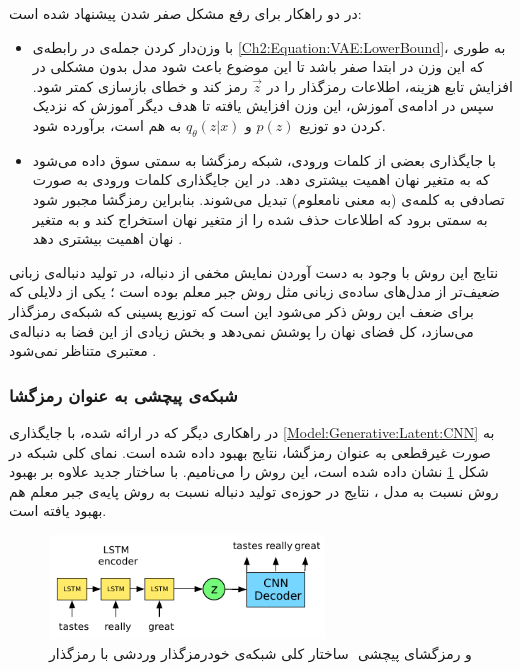  در
 دو راهکار برای رفع مشکل صفر شدن
  پیشنهاد شده است:
  \begin{itemize}
  	\item 
با وزن‌دار کردن جمله‌ی 
  	در رابطه‌ی
  	\ref{Ch2:Equation:VAE:LowerBound}، 
  به طوری که این وزن در ابتدا صفر باشد تا این موضوع باعث شود مدل بدون مشکلی در افزایش تابع هزینه، اطلاعات رمزگذار را در
  	$\vec{z}$
  	رمز کند و خطای بازسازی کمتر شود. سپس در ادامه‌ی آموزش، این وزن افزایش یافته تا هدف دیگر آموزش که نزدیک کردن دو توزیع 
  	$p(z)$
  	و
  	$q_{\theta}(z|x)$
  	به هم است، برآورده شود. 
  	\item
با جایگذاری بعضی از کلمات ورودی، شبکه رمزگشا به سمتی سوق داده می‌شود که به متغیر نهان اهمیت بیشتری دهد. در این جایگذاری کلمات ورودی به صورت تصادفی به کلمه‌ی 
  	(به معنی نامعلوم)
تبدیل می‌شوند. بنابراین رمزگشا مجبور شود به سمتی برود که اطلاعات حذف شده را از متغیر نهان استخراج کند و به متغیر نهان اهمیت بیشتری دهد
  	\cite{Bowman2016VAE}.
  \end{itemize}
 نتایج این روش با وجود به دست آوردن نمایش مخفی از دنباله، در تولید دنباله‌ی زبانی ضعیف‌تر از مدل‌های ساده‌ی زبانی مثل روش جبر معلم بوده است
  \cite{Bowman2016VAE}؛
یکی از دلایلی که برای ضعف این روش ذکر می‌شود این است که توزیع پسینی که شبکه‌ی رمزگذار می‌سازد، کل فضای نهان را پوشش نمی‌دهد و بخش زیادی از این فضا به دنباله‌ی معتبری متناظر نمی‌شود
   \cite{Zhang2017TextGAN}.

\subsubsection{شبکه‌ی پیچشی به عنوان رمزگشا}
در راهکاری دیگر که در 
 \cite{Yang2017ImprovedVAE}
 ارائه شده، با جایگذاری 
 \ref{Model:Generative:Latent:CNN}
به صورت غیرقطعی به عنوان رمزگشا، نتایج بهبود داده شده است. نمای کلی شبکه در شکل
 \ref{Figure:ImprovedVAE:Architecture}
 نشان داده شده است، این روش را
 می‌نامیم. با ساختار جدید علاوه بر بهبود روش نسبت به مدل 
  ،
نتایج در حوزه‌ی تولید دنباله نسبت به روش‌ پایه‌ی جبر معلم هم بهبود یافته است.
 \newline
 \begin{figure}[!htb]
 	\centering
 	\includegraphics[width=0.65\textwidth]{images/ArchitectureImprovedVAE.pdf} 
 	\caption[ساختار کلی شبکه‌ی خودرمزگذار وردشی با رمزگذار  و رمزگشای پیچشی]
 	{ساختار کلی شبکه‌ی خودرمزگذار وردشی با رمزگذار ‎ و رمزگشای پیچشی 
 		\cite{Yang2017ImprovedVAE}
 		}
 	\label{Figure:ImprovedVAE:Architecture}
 \end{figure}

